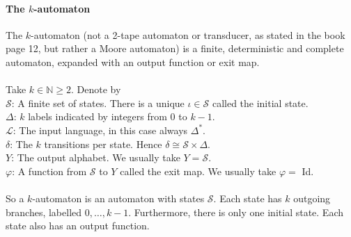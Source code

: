 \documentclass{article}
\begin{document}
\paragraph{The $k$-automaton}
The $k$-automaton (not a 2-tape automaton or transducer, as stated in the
book \cite{Fogg} page 12, but rather a Moore automaton) is a finite, 
deterministic and complete automaton, expanded with an output function or 
exit map.\\
\\
Take $k \in \mathbb{N} \ge 2$. Denote by\\
$\mathcal{S}$: A finite set of states. There is a unique 
$\iota \in \mathcal{S}$ called the initial state.\\
$\Delta$: $k$ labels indicated by integers from 0 to $k - 1$.\\
$\mathcal{L}$: The input language, in this case always $\Delta^*$.\\
$\delta$: The $k$ transitions per state. Hence 
$\delta \cong \mathcal{S} \times \Delta$.\\
$Y$: The output alphabet. We usually take $Y = \mathcal{S}$.\\
$\varphi$: A function from $\mathcal{S}$ to $Y$ called the exit map. We
           usually take $\varphi =$ Id.\\
\\
So a $k$-automaton is an automaton with states $\mathcal{S}$. Each state has
$k$ outgoing branches, labelled $0, \ldots, k - 1$. Furthermore, there is only
one initial state. Each state also has an output function.
\end{document}
